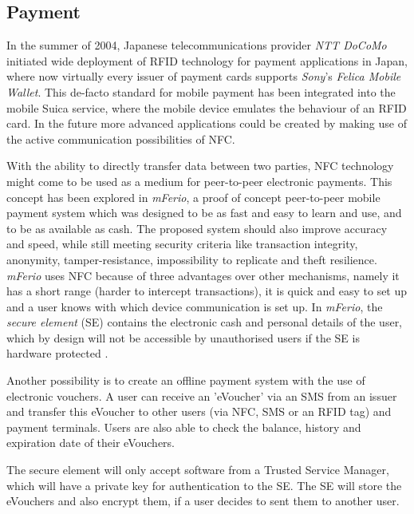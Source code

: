 

\subsection{Payment}
In the summer of 2004, Japanese telecommunications provider \textit{NTT DoCoMo} initiated wide deployment of RFID technology for payment applications in Japan, where now virtually every issuer of payment cards supports \textit{Sony}'s \textit{Felica Mobile Wallet}.
This de-facto standard for mobile payment has been integrated into the mobile Suica service, where the mobile device emulates the behaviour of an RFID card.
In the future more advanced applications could be created by making use of the active communication possibilities of NFC.
\cite{yamauchi2006intensive}

With the ability to directly transfer data between two parties, NFC technology might come to be used as a medium for peer-to-peer electronic payments.
This concept has been explored in \textit{mFerio}, a proof of concept peer-to-peer mobile payment system which was designed to be as fast and easy to learn and use, and to be as available as cash.
The proposed system should also improve accuracy and speed, while still meeting security criteria like transaction integrity, anonymity, tamper-resistance, impossibility to replicate and theft resilience. 
\textit{mFerio} uses NFC because of three advantages over other mechanisms, namely it has a short range (harder to intercept transactions), it is quick and easy to set up and a user knows with which device communication is set up.
In \textit{mFerio}, the \textit{secure element} (SE) contains the electronic cash and personal details of the user, which by design will not be accessible by unauthorised users if the SE is hardware protected \cite{1555846}.

Another possibility is to create an offline payment system with the use of electronic vouchers.
A user can receive an 'eVoucher' via an SMS from an issuer and transfer this eVoucher to other users (via NFC, SMS or an RFID tag) and payment terminals.
Users are also able to check the balance, history and expiration date of their eVouchers. 

The secure element will only accept software from a Trusted Service Manager, which will have a private key for authentication to the SE.
The SE will store the eVouchers and also encrypt them, if a user decides to sent them to another user. \cite{1592613}

